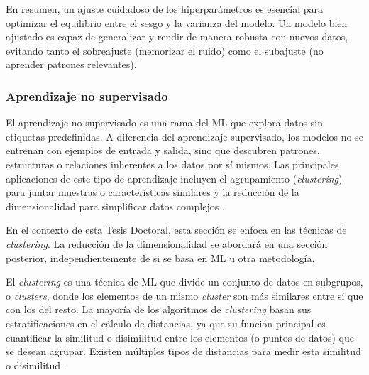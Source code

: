 En resumen, un ajuste cuidadoso de los hiperparámetros es esencial para optimizar el equilibrio entre el sesgo y la varianza del modelo. Un modelo bien ajustado es capaz de generalizar y rendir de manera robusta con nuevos datos, evitando tanto el sobreajuste (memorizar el ruido) como el subajuste (no aprender patrones relevantes).


\subsubsection{Aprendizaje no supervisado}

El aprendizaje no supervisado es una rama del ML que explora datos sin etiquetas predefinidas. A diferencia del aprendizaje supervisado, los modelos no se entrenan con ejemplos de entrada y salida, sino que descubren patrones, estructuras o relaciones inherentes a los datos por sí mismos. Las principales aplicaciones de este tipo de aprendizaje incluyen el agrupamiento (\textit{clustering}) para juntar muestras o características similares y la reducción de la dimensionalidad para simplificar datos complejos \cite{bishop2006pattern}.

En el contexto de esta Tesis Doctoral, esta sección se enfoca en las técnicas de \textit{clustering}. La reducción de la dimensionalidad se abordará en una sección posterior, independientemente de si se basa en ML u otra metodología.

El \textit{clustering} es una técnica de ML que divide un conjunto de datos en subgrupos, o \textit{clusters}, donde los elementos de un mismo \textit{cluster} son más similares entre sí que con los del resto. La mayoría de los algoritmos de \textit{clustering} basan sus estratificaciones en el cálculo de distancias, ya que su función principal es cuantificar la similitud o disimilitud entre los elementos (o puntos de datos) que se desean agrupar. Existen múltiples tipos de distancias para medir esta similitud o disimilitud \cite{bishop2006pattern}.

